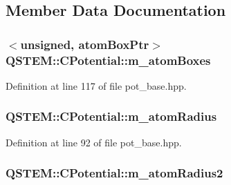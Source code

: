 \subsection{Member Data Documentation}
\hypertarget{class_q_s_t_e_m_1_1_c_potential_af06c591a7de14cc9644892953afbbddf}{
\subsubsection[{m\-\_\-atom\-Boxes}]{$<$unsigned, {\bf atom\-Box\-Ptr}$>$ Q\-S\-T\-E\-M\-::\-C\-Potential\-::m\-\_\-atom\-Boxes\hspace{0.3cm}{\ttfamily [protected]}}}\label{class_q_s_t_e_m_1_1_c_potential_af06c591a7de14cc9644892953afbbddf}


Definition at line 117 of file pot\-\_\-base.\-hpp.

\hypertarget{class_q_s_t_e_m_1_1_c_potential_af11a143b59973336fee04b7c0b488699}{
\subsubsection[{m\-\_\-atom\-Radius}]{ Q\-S\-T\-E\-M\-::\-C\-Potential\-::m\-\_\-atom\-Radius}}\label{class_q_s_t_e_m_1_1_c_potential_af11a143b59973336fee04b7c0b488699}


Definition at line 92 of file pot\-\_\-base.\-hpp.

\hypertarget{class_q_s_t_e_m_1_1_c_potential_a279798b576e5bd9907e5635226838a43}{
\subsubsection[{m\-\_\-atom\-Radius2}]{ Q\-S\-T\-E\-M\-::\-C\-Potential\-::m\-\_\-atom\-Radius2\hspace{0.3cm}{\ttfamily [protected]}}}\label{class_q_s_t_e_m_1_1_c_potential_a279798b576e5bd9907e5635226838a43}


